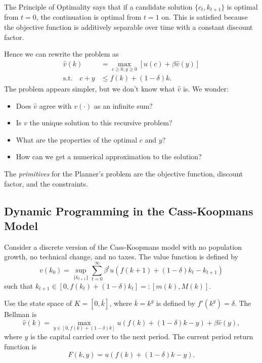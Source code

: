 \documentclass{tufte-handout}
\theoremstyle{definition}
\begin{document}
The Principle of Optimality says that if a candidate solution $\{c_t, k_{t+1}\}$ is optimal from $t=0$, the continuation is optimal from $t=1$ on. This is satisfied because the objective function is additively separable over time with a constant discount factor.

Hence we can rewrite the problem as
\begin{align*}
	\hat{v}(k) &= \max_{c\ge 0,y \ge 0} \left[ u(c) + \beta\hat{v}(y) \right]  \\
	\text{s.t.} \quad c+ y &\le f(k) + (1-\delta)k
.\end{align*}
The problem appears simpler, but we don't know what $\hat{v}$ is. We wonder:
\begin{itemize}
	\item Does $\hat{v}$ agree with $v(\cdot)$ as an infinite sum?
	\item Is $v$ the unique solution to this recursive problem?
	\item What are the properties of the optimal $c$ and $y$?
	\item How can we get a numerical approximation to the solution?
\end{itemize}

The \emph{primitives} for the Planner's problem are the objective function, discount factor, and the constraints. 

\subsection{Dynamic Programming in the Cass-Koopmans Model}
Consider a discrete version of the Cass-Koopmans model with no population growth, no technical change, and no taxes.
The value function is defined by
\begin{equation}
	v(k_0) = \sup\limits_{\{k_{t+1}\}} \sum\limits_{t=0}^{\infty} \beta^t u\left( f(k+1) + (1-\delta)k_t - k_{t+1} \right) \label{eq:10-21-SP}
\end{equation}
such that $k_{t+1} \in \left[ 0, f(k_t) + (1-\delta)k_t \right] =: [m(k),M(k)]$.

Use the state space of $K = [0,\overline{k}]$, where $\overline{k} = k^g$ is defined by $f'(k^g) = \delta$. The Bellman is
\begin{equation}
	\hat{v}(k) = \max_{y \in [0,f(k) + (1-\delta)k]} u\left( f(k) + (1-\delta)k - y \right) + \beta \hat{v}(y) \label{eq:10-21-BE}
,\end{equation}
where $y$ is the capital carried over to the next period.
The current period return function is
\begin{equation}
	F(k,y) = u\left( f(k) + (1-\delta)k - y \right) \label{eq:10-21-F}
.\end{equation}
\end{document}

